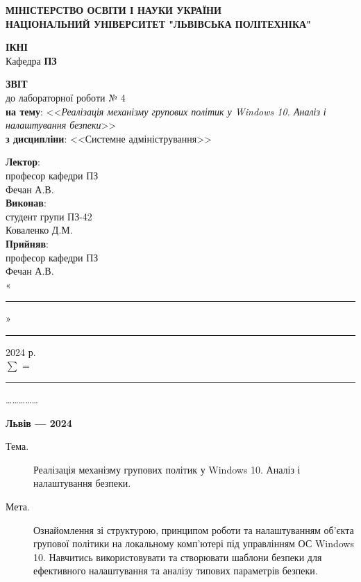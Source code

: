 \documentclass[oneside,14pt]{extarticle}
\newcommand\subject{Системне адміністрування}
\newcommand\lecturer{професор кафедри ПЗ\\Фечан А.В.}
\newcommand\teacher{професор кафедри ПЗ\\Фечан А.В.}
\newcommand\mygroup{ПЗ-42}
\newcommand\lab{4}
\newcommand\theme{Реалізація механізму групових політик у Windows 10. Аналіз
	і налаштування безпеки}
\newcommand\purpose{Ознайомлення зі структурою, принципом роботи та
	налаштуванням об’єкта групової політики на локальному комп’ютері під
	управлінням ОС Windows 10. Навчитись використовувати та створювати
	шаблони безпеки для ефективного налаштування та аналізу типових параметрів
	безпеки}
\begin{document}
\begin{normalsize}
	\begin{titlepage}
		\thispagestyle{empty}
		\begin{center}
			\textbf{МІНІСТЕРСТВО ОСВІТИ І НАУКИ УКРАЇНИ\\
				НАЦІОНАЛЬНИЙ УНІВЕРСИТЕТ "ЛЬВІВСЬКА ПОЛІТЕХНІКА"}
		\end{center}
		\begin{flushright}
			\textbf{ІКНІ}\\
			Кафедра \textbf{ПЗ}
		\end{flushright}
		\vspace{80pt}
		\begin{center}
			\textbf{ЗВІТ}\\
			\vspace{10pt}
			до лабораторної роботи № \lab\\
			\textbf{на тему}: <<\textit{\theme}>>\\
			\textbf{з дисципліни}: <<\subject>>
		\end{center}
		\vspace{80pt}
		\begin{flushright}
			
			\textbf{Лектор}:\\
			\lecturer\\
			\vspace{28pt}
			\textbf{Виконав}:\\
			
			студент групи \mygroup\\
			Коваленко Д.М.\\
			\vspace{28pt}
			\textbf{Прийняв}:\\
			
			\teacher\\
			
			\vspace{28pt}
			«\rule{1cm}{0.15mm}» \rule{1.5cm}{0.15mm} 2024 р.\\
			$\sum$ = \rule{1cm}{0.15mm}……………\\
			
		\end{flushright}
		\vspace{\fill}
		\begin{center}
			\textbf{Львів — 2024}
		\end{center}
	\end{titlepage}
		
	\begin{description}
		\item[Тема.] \theme.
		\item[Мета.] \purpose.
	\end{description}


\end{normalsize}
\end{document}
